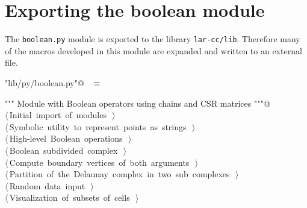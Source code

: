 \documentclass[11pt,oneside]{article}	%
\begin{document}
\section{Exporting the boolean module}

The \texttt{boolean.py} module is exported to the library \texttt{lar-cc/lib}. Therefore many of the macros developed in this module are expanded and written to an external file.

\begin{flushleft} \small
\begin{minipage}{\linewidth} \label{scrap16}
\verb@"lib/py/boolean.py"@\nobreak\ {\footnotesize {} }$\equiv$
\vspace{-1ex}
\begin{list}{}{} \item
\mbox{}\verb@""" Module with Boolean operators using chains and CSR matrices """@\\
\mbox{}\verb@@\hbox{$\langle\,$Initial import of modules\nobreak\ {\footnotesize {}}$\,\rangle$}\verb@@\\
\mbox{}\verb@@\hbox{$\langle\,$Symbolic utility to represent points as strings\nobreak\ {\footnotesize {}}$\,\rangle$}\verb@@\\
\mbox{}\verb@@\hbox{$\langle\,$High-level Boolean operations\nobreak\ {\footnotesize {}}$\,\rangle$}\verb@@\\
\mbox{}\verb@@\hbox{$\langle\,$Boolean subdivided complex\nobreak\ {\footnotesize {}}$\,\rangle$}\verb@@\\
\mbox{}\verb@@\hbox{$\langle\,$Compute boundary vertices of both arguments\nobreak\ {\footnotesize {}}$\,\rangle$}\verb@@\\
\mbox{}\verb@@\hbox{$\langle\,$Partition of the Delaunay complex in two sub complexes\nobreak\ {\footnotesize {}}$\,\rangle$}\verb@@\\
\mbox{}\verb@@\hbox{$\langle\,$Random data input\nobreak\ {\footnotesize {}}$\,\rangle$}\verb@@\\
\mbox{}\verb@@\hbox{$\langle\,$Visualization of subsets of cells\nobreak\ {\footnotesize {}}$\,\rangle$}\verb@@\\
\mbox{}\verb@@{\NWsep}
\end{list}
\vspace{-2ex}
\end{minipage}\\[4ex]
\end{flushleft}
\end{document}
